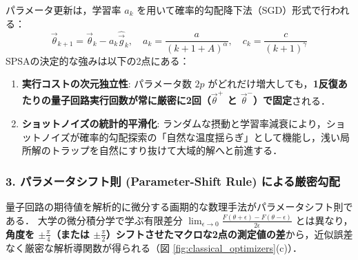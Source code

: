 \documentclass[11pt,a4paper,oneside,openany]{ltjsbook}
\theoremstyle{definition}
\theoremstyle{plain}
\theoremstyle{remark}
\begin{document}
パラメータ更新は，学習率 $a_k$ を用いて確率的勾配降下法（SGD）形式で行われる：
\begin{equation}
    \vec{\theta}_{k+1} = \vec{\theta}_k - a_k \hat{\vec{g}}_k, \quad a_k = \frac{a}{(k + 1 + A)^\alpha}, \quad c_k = \frac{c}{(k + 1)^\gamma}
\end{equation}
SPSAの決定的な強みは以下の2点にある：
\begin{enumerate}
    \item \textbf{実行コストの次元独立性}: パラメータ数 $2p$ がどれだけ増大しても，\textbf{1反復あたりの量子回路実行回数が常に厳密に2回（$\vec{\theta}^+$ と $\vec{\theta}^-$）で固定}される．
    \item \textbf{ショットノイズの統計的平滑化}: ランダムな摂動と学習率減衰により，ショットノイズが確率的勾配探索の「自然な温度揺らぎ」として機能し，浅い局所解のトラップを自然にすり抜けて大域的解へと前進する．
\end{enumerate}

\subsubsection*{3. パラメータシフト則 (Parameter-Shift Rule) による厳密勾配 \cite{mitarai2018quantum,schuld2019evaluating}}
量子回路の期待値を解析的に微分する画期的な数理手法がパラメータシフト則である．
大学の微分積分学で学ぶ有限差分 $\lim_{\epsilon \to 0} \frac{F(\theta+\epsilon)-F(\theta-\epsilon)}{2\epsilon}$ とは異なり，\textbf{角度を $\pm \frac{\pi}{4}$（または $\pm \frac{\pi}{2}$）シフトさせたマクロな2点の測定値の差}から，近似誤差なく厳密な解析導関数が得られる（図 \ref{fig:classical_optimizers}(c)）．
\end{document}
